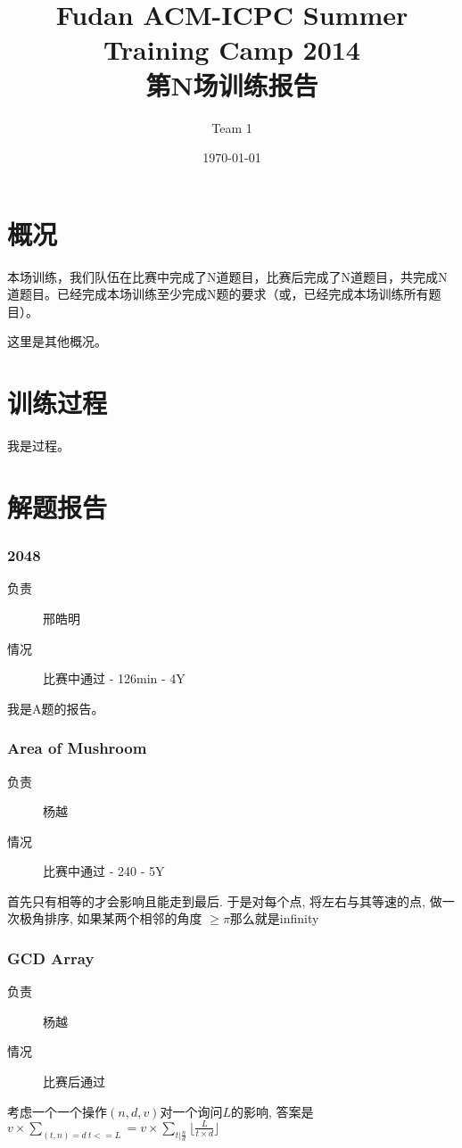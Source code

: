 \documentclass[a4paper, 11pt, nofonts, nocap, fancyhdr]{ctexart}
\title{Fudan ACM-ICPC Summer Training Camp 2014\\第N场训练报告}
\author{Team 1}
\date{\today}
\newcommand{\problem}[1]{\subsubsection{#1}}
\begin{document}
\maketitle

\section{概况}

本场训练，我们队伍在比赛中完成了N道题目，比赛后完成了N道题目，共完成N道题目。已经完成本场训练至少完成N题的要求（或，已经完成本场训练所有题目）。

这里是其他概况。

\section{训练过程}

我是过程。

\section{解题报告}

\problem{2048}

\begin{description}
\item[负责] 邢皓明
\item[情况] 比赛中通过 - 126min - 4Y
\end{description}

我是A题的报告。

\problem{Area of Mushroom}

\begin{description}
\item[负责] 杨越
\item[情况] 比赛中通过 - 240 - 5Y
\end{description}

首先只有相等的才会影响且能走到最后. 于是对每个点, 将左右与其等速的点, 做一次极角排序, 如果某两个相邻的角度 $\geq \pi$那么就是infinity

\problem{GCD Array}

\begin{description}
\item[负责] 杨越
\item[情况] 比赛后通过
\end{description}

考虑一个一个操作$(n, d, v)$对一个询问$L$的影响, 答案是$v\times \sum\limits_{(t,n)=d\ t<=L} = v\times \sum\limits_{t|\frac{n}{d}} \lfloor\frac{L}{t\times d}\rfloor$
\end{document}
